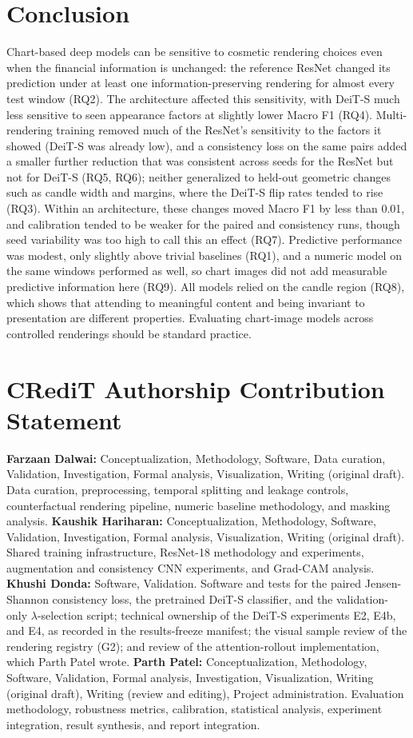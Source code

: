 \documentclass[10pt,journal,compsoc]{IEEEtran}
\begin{document}
\section{Conclusion}\label{sec:conclusion}
Chart-based deep models can be sensitive to cosmetic rendering choices even when the financial information is unchanged: the reference ResNet changed its prediction under at least one information-preserving rendering for almost every test window (RQ2). The architecture affected this sensitivity, with DeiT-S much less sensitive to seen appearance factors at slightly lower Macro F1 (RQ4). Multi-rendering training removed much of the ResNet's sensitivity to the factors it showed (DeiT-S was already low), and a consistency loss on the same pairs added a smaller further reduction that was consistent across seeds for the ResNet but not for DeiT-S (RQ5, RQ6); neither generalized to held-out geometric changes such as candle width and margins, where the DeiT-S flip rates tended to rise (RQ3). Within an architecture, these changes moved Macro F1 by less than 0.01, and calibration tended to be weaker for the paired and consistency runs, though seed variability was too high to call this an effect (RQ7). Predictive performance was modest, only slightly above trivial baselines (RQ1), and a numeric model on the same windows performed as well, so chart images did not add measurable predictive information here (RQ9). All models relied on the candle region (RQ8), which shows that attending to meaningful content and being invariant to presentation are different properties. Evaluating chart-image models across controlled renderings should be standard practice.

\section*{CRediT Authorship Contribution Statement}
\textbf{Farzaan Dalwai:} Conceptualization, Methodology, Software, Data curation, Validation, Investigation, Formal analysis, Visualization, Writing (original draft). Data curation, preprocessing, temporal splitting and leakage controls, counterfactual rendering pipeline, numeric baseline methodology, and masking analysis.
\textbf{Kaushik Hariharan:} Conceptualization, Methodology, Software, Validation, Investigation, Formal analysis, Visualization, Writing (original draft). Shared training infrastructure, ResNet-18 methodology and experiments, augmentation and consistency CNN experiments, and Grad-CAM analysis.
\textbf{Khushi Donda:} Software, Validation. Software and tests for the paired Jensen-Shannon consistency loss, the pretrained DeiT-S classifier, and the validation-only $\lambda$-selection script; technical ownership of the DeiT-S experiments E2, E4b, and E4, as recorded in the results-freeze manifest; the visual sample review of the rendering registry (G2); and review of the attention-rollout implementation, which Parth Patel wrote.
\textbf{Parth Patel:} Conceptualization, Methodology, Software, Validation, Formal analysis, Investigation, Visualization, Writing (original draft), Writing (review and editing), Project administration. Evaluation methodology, robustness metrics, calibration, statistical analysis, experiment integration, result synthesis, and report integration.
\end{document}
